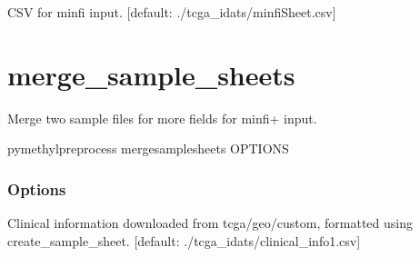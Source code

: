 \documentclass[letterpaper,10pt,english]{sphinxmanual}
\begin{document}
\begin{fulllineitems}
\label{\detokenize{index:cmdoption-pymethyl-preprocess-meffil-encode-os}}
CSV for minfi input.  {[}default: ./tcga\_idats/minfiSheet.csv{]}

\end{fulllineitems}



\section{merge\_sample\_sheets}
\label{\detokenize{index:pymethyl-preprocess-merge-sample-sheets}}
Merge two sample files for more fields for minfi+ input.

\begin{sphinxVerbatim}[commandchars=\\\{\}]
pymethyl\PYGZhy{}preprocess merge\PYGZus{}sample\PYGZus{}sheets \PYG{o}{[}OPTIONS\PYG{o}{]}
\end{sphinxVerbatim}
\subsubsection*{Options}

\begin{fulllineitems}
\label{\detokenize{index:cmdoption-pymethyl-preprocess-merge-sample-sheets-s1}}
Clinical information downloaded from tcga/geo/custom, formatted using create\_sample\_sheet.  {[}default: ./tcga\_idats/clinical\_info1.csv{]}

\end{fulllineitems}
\end{document}
